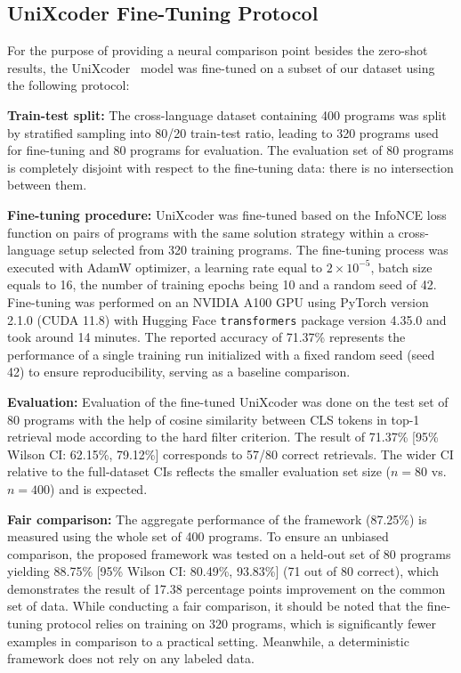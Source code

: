 \subsection{UniXcoder Fine-Tuning Protocol}
\label{subsec:neural_finetuning}

For the purpose of providing a neural comparison point besides the zero-shot results, the UniXcoder~\cite{ref_unixcoder} model was fine-tuned on a subset of our dataset using the following protocol:

\textbf{Train-test split:} The cross-language dataset containing 400 programs was split by stratified sampling into 80/20 train-test ratio, leading to 320 programs used for fine-tuning and 80 programs for evaluation. The evaluation set of 80 programs is completely disjoint with respect to the fine-tuning data: there is no intersection between them.

\textbf{Fine-tuning procedure:} UniXcoder was fine-tuned based on the InfoNCE loss function on pairs of programs with the same solution strategy within a cross-language setup selected from 320 training programs. The fine-tuning process was executed with AdamW optimizer, a learning rate equal to $2 \times 10^{-5}$, batch size equals to 16, the number of training epochs being 10 and a random seed of 42. Fine-tuning was performed on an NVIDIA A100 GPU using PyTorch version 2.1.0 (CUDA 11.8) with Hugging Face \texttt{transformers} package version 4.35.0 and took around 14 minutes. The reported accuracy of 71.37\% represents the performance of a single training run initialized with a fixed random seed (seed 42) to ensure reproducibility, serving as a baseline comparison.

\textbf{Evaluation:} Evaluation of the fine-tuned UniXcoder was done on the test set of 80 programs with the help of cosine similarity between CLS tokens in top-1 retrieval mode according to the hard filter criterion. The result of 71.37\% [95\% Wilson CI: 62.15\%, 79.12\%] corresponds to 57/80 correct retrievals. The wider CI relative to the full-dataset CIs reflects the smaller evaluation set size ($n=80$ vs. $n=400$) and is expected.

\textbf{Fair comparison:} The aggregate performance of the framework (87.25\%) is measured using the whole set of 400 programs. To ensure an unbiased comparison, the proposed framework was tested on a held-out set of 80 programs yielding 88.75\% [95\% Wilson CI: 80.49\%, 93.83\%] (71 out of 80 correct), which demonstrates the result of 17.38 percentage points improvement on the common set of data. While conducting a fair comparison, it should be noted that the fine-tuning protocol relies on training on 320 programs, which is significantly fewer examples in comparison to a practical setting. Meanwhile, a deterministic framework does not rely on any labeled data.

